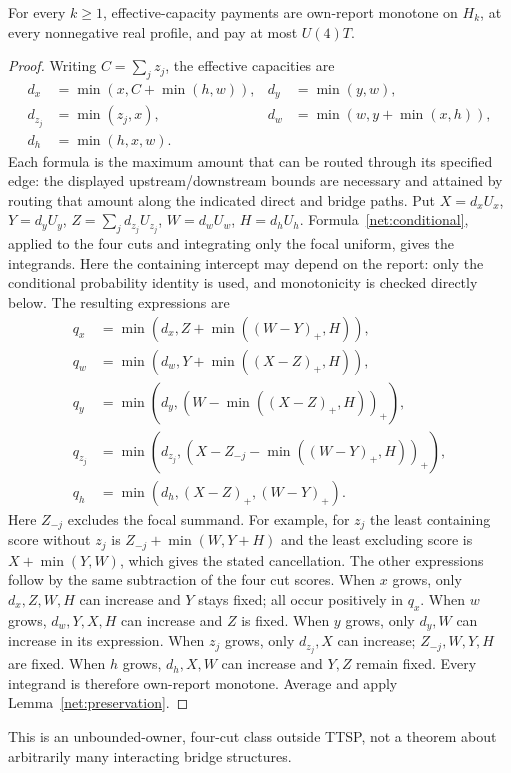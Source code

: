 \begin{proposition}\label{net:bundle}
For every $k\ge1$, effective-capacity payments are own-report monotone on
$H_k$, at every nonnegative real profile, and pay at most $U(4)T$.
\end{proposition}
\begin{proof}
Writing $C=\sum_jz_j$, the effective capacities are
\[
 \begin{aligned}
 d_x&=\min(x,C+\min(h,w)),&d_y&=\min(y,w),\\
 d_{z_j}&=\min(z_j,x),&d_w&=\min(w,y+\min(x,h)),\\
 d_h&=\min(h,x,w).
 \end{aligned}
\]
Each formula is the maximum amount that can be routed through its specified
edge: the displayed upstream/downstream bounds are necessary and attained
by routing that amount along the indicated direct and bridge paths.
Put $X=d_xU_x$, $Y=d_yU_y$, $Z=\sum_jd_{z_j}U_{z_j}$,
$W=d_wU_w$, $H=d_hU_h$.  Formula~\eqref{net:conditional}, applied to the
four cuts and integrating only the focal uniform, gives the integrands.
Here the containing intercept may depend on the report: only the conditional
probability identity is used, and monotonicity is checked directly below.
The resulting expressions are
\[
 \begin{aligned}
 q_x&=\min(d_x,Z+\min((W-Y)_+,H)),\\
 q_w&=\min(d_w,Y+\min((X-Z)_+,H)),\\
 q_y&=\min(d_y,(W-\min((X-Z)_+,H))_+),\\
 q_{z_j}&=\min(d_{z_j},(X-Z_{-j}-\min((W-Y)_+,H))_+),\\
 q_h&=\min(d_h,(X-Z)_+,(W-Y)_+).
 \end{aligned}
\]
Here $Z_{-j}$ excludes the focal summand.  For example, for $z_j$ the
least containing score without $z_j$ is $Z_{-j}+\min(W,Y+H)$ and the least
excluding score is $X+\min(Y,W)$, which gives the stated cancellation.
The other expressions follow by the same subtraction of the four cut scores.
When $x$ grows, only $d_x,Z,W,H$ can increase and $Y$ stays fixed; all occur
positively in $q_x$.  When $w$ grows, $d_w,Y,X,H$ can increase and $Z$ is
fixed.  When $y$ grows, only $d_y,W$ can increase in its expression.
When $z_j$ grows, only $d_{z_j},X$ can increase; $Z_{-j},W,Y,H$ are fixed.
When $h$ grows, $d_h,X,W$ can increase and $Y,Z$ remain fixed.
Every integrand is therefore own-report monotone.  Average and apply
Lemma~\ref{net:preservation}.
\end{proof}
This is an unbounded-owner, four-cut class outside TTSP, not a theorem about
arbitrarily many interacting bridge structures.

